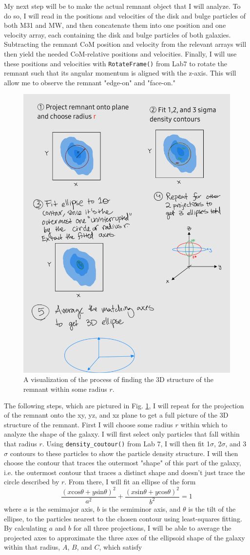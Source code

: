 \documentclass[linenumbers]{aastex631}
\begin{document}
My next step will be to make the actual remnant object that I will analyze. 
To do so, I will read in the positions and velocities of the disk and bulge particles of both M31 and MW, and then concatenate them into one position and one velocity array, each containing the disk and bulge particles of both galaxies.
Subtracting the remnant CoM position and velocity from the relevant arrays will then yield the needed CoM-relative positions and velocities. 
Finally, I will use these positions and velocities with \texttt{RotateFrame()} from Lab7 to rotate the remnant such that its angular momentum is aligned with the z-axis.
This will allow me to observe the remnant "edge-on" and "face-on."
\begin{figure}[h!]
    \centering
    \includegraphics[width=0.5\linewidth]{Methods.jpg}
    \caption{
        A visualization of the process of finding the 3D structure of the remnant within some radius $r$.
    }
    \label{fig:methods}
\end{figure}

The following steps, which are pictured in Fig. \ref{fig:methods}, I will repeat for the projection of the remnant onto the xy, yz, and xz plane to get a full picture of the 3D structure of the remnant.
First I will choose some radius $r$ within which to analyze the shape of the galaxy. 
I will first select only particles that fall within that radius $r$. 
Using \texttt{density\_coutour()} from Lab 7, I will then fit 1$\sigma$, 2$\sigma$, and 3$\sigma$ contours to these particles to show the particle density structure.
I will then choose the contour that traces the outermost "shape" of this part of the galaxy, i.e. the outermost contour that traces a distinct shape and doesn't just trace the circle described by $r$. 
From there, I will fit an ellipse of the form 
\begin{equation}
    \frac{(x\text{cos}\theta + y\text{sin}\theta)^2}{a^2} + \frac{(x\text{sin}\theta + y\text{cos}\theta)^2}{b^2} = 1
\end{equation}
where $a$ is the semimajor axis, $b$ is the semiminor axis, and $\theta$ is the tilt of the ellipse, to the particles nearest to the chosen contour using least-squares fitting.
By calculating $a$ and $b$ for all three projections, I will be able to average the projected axes to approximate the three axes of the ellipsoid shape of the galaxy within that radius, $A$, $B$, and $C$, which satisfy
\end{document}
